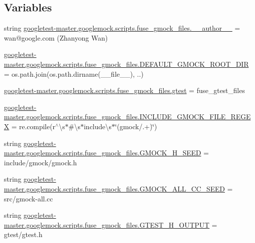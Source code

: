 \subsection*{Variables}
\begin{DoxyCompactItemize}
\item 
string \mbox{\hyperlink{namespacegoogletest-master_1_1googlemock_1_1scripts_1_1fuse__gmock__files_a535148731205b245c9352f9985ffc456}{googletest-\/master.\+googlemock.\+scripts.\+fuse\+\_\+gmock\+\_\+files.\+\_\+\+\_\+author\+\_\+\+\_\+}} = \textquotesingle{}wan@google.\+com (Zhanyong Wan)\textquotesingle{}
\item 
\mbox{\hyperlink{namespacegoogletest-master_1_1googlemock_1_1scripts_1_1fuse__gmock__files_af96d4aa2f8eecb1eb26d3669c09c5bbc}{googletest-\/master.\+googlemock.\+scripts.\+fuse\+\_\+gmock\+\_\+files.\+D\+E\+F\+A\+U\+L\+T\+\_\+\+G\+M\+O\+C\+K\+\_\+\+R\+O\+O\+T\+\_\+\+D\+IR}} = os.\+path.\+join(os.\+path.\+dirname(\+\_\+\+\_\+file\+\_\+\+\_\+), \textquotesingle{}..\textquotesingle{})
\item 
\mbox{\hyperlink{namespacegoogletest-master_1_1googlemock_1_1scripts_1_1fuse__gmock__files_a22e996ecb2be69d17ff02477f2776f9a}{googletest-\/master.\+googlemock.\+scripts.\+fuse\+\_\+gmock\+\_\+files.\+gtest}} = fuse\+\_\+gtest\+\_\+files
\item 
\mbox{\hyperlink{namespacegoogletest-master_1_1googlemock_1_1scripts_1_1fuse__gmock__files_aa9bb300f28f02d57075dc368ef4b4b2c}{googletest-\/master.\+googlemock.\+scripts.\+fuse\+\_\+gmock\+\_\+files.\+I\+N\+C\+L\+U\+D\+E\+\_\+\+G\+M\+O\+C\+K\+\_\+\+F\+I\+L\+E\+\_\+\+R\+E\+G\+EX}} = re.\+compile(r\textquotesingle{}$^\wedge$\textbackslash{}s$\ast$\#\textbackslash{}s$\ast$include\textbackslash{}s$\ast$\char`\"{}(gmock/.+)\char`\"{}\textquotesingle{})
\item 
string \mbox{\hyperlink{namespacegoogletest-master_1_1googlemock_1_1scripts_1_1fuse__gmock__files_a8d50039dbf10aeec60828661c16c3e8c}{googletest-\/master.\+googlemock.\+scripts.\+fuse\+\_\+gmock\+\_\+files.\+G\+M\+O\+C\+K\+\_\+\+H\+\_\+\+S\+E\+ED}} = \textquotesingle{}include/gmock/gmock.\+h\textquotesingle{}
\item 
string \mbox{\hyperlink{namespacegoogletest-master_1_1googlemock_1_1scripts_1_1fuse__gmock__files_a8f43b7a2df08975aea31ed4b4de9d836}{googletest-\/master.\+googlemock.\+scripts.\+fuse\+\_\+gmock\+\_\+files.\+G\+M\+O\+C\+K\+\_\+\+A\+L\+L\+\_\+\+C\+C\+\_\+\+S\+E\+ED}} = \textquotesingle{}src/gmock-\/all.\+cc\textquotesingle{}
\item 
string \mbox{\hyperlink{namespacegoogletest-master_1_1googlemock_1_1scripts_1_1fuse__gmock__files_a8e50c3e1df119e9001419d08d35c5a8d}{googletest-\/master.\+googlemock.\+scripts.\+fuse\+\_\+gmock\+\_\+files.\+G\+T\+E\+S\+T\+\_\+\+H\+\_\+\+O\+U\+T\+P\+UT}} = \textquotesingle{}gtest/gtest.\+h\textquotesingle{}

\end{DoxyCompactItemize}
